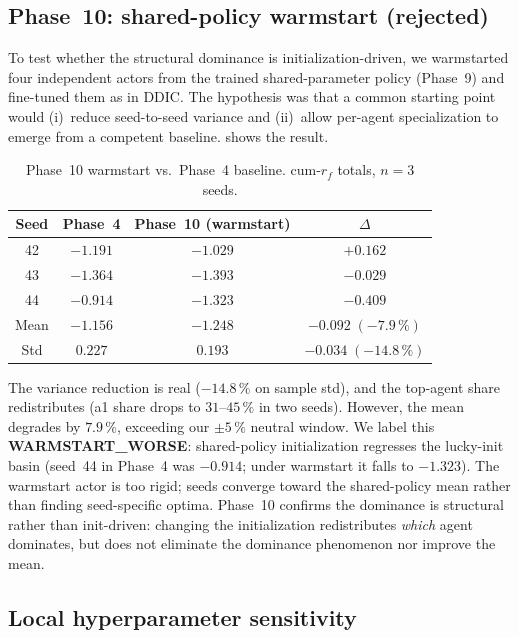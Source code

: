 \documentclass[journal,onecolumn,11pt]{IEEEtran}
\begin{document}
\subsection{Phase~10: shared-policy warmstart (rejected)}

To test whether the structural dominance is initialization-driven, we
warmstarted four independent actors from the trained shared-parameter
policy (Phase~9) and fine-tuned them as in DDIC. The hypothesis was
that a common starting point would (i)~reduce seed-to-seed variance
and (ii)~allow per-agent specialization to emerge from a competent
baseline.  shows the result.

\begin{table}[!t]
  \centering
  \caption{Phase~10 warmstart vs.\ Phase~4 baseline. cum-$r_f$ totals,
  $n = 3$ seeds.}
  \label{tab:phase10}
  \footnotesize
  \begin{tabular}{cccc}
    \toprule
    Seed & Phase~4 & Phase~10 (warmstart) & $\Delta$ \\
    \midrule
    42 & $-1.191$ & $-1.029$ & $+0.162$ \\
    43 & $-1.364$ & $-1.393$ & $-0.029$ \\
    44 & $-0.914$ & $-1.323$ & $-0.409$ \\
    \midrule
    Mean & $-1.156$ & $-1.248$ & $-0.092\;(-7.9\,\%)$ \\
    Std  & $0.227$  & $0.193$  & $-0.034\;(-14.8\,\%)$ \\
    \bottomrule
  \end{tabular}
\end{table}

The variance reduction is real ($-14.8\,\%$ on sample std), and the
top-agent share redistributes (a1 share drops to $31$--$45\,\%$ in two
seeds). However, the mean degrades by $7.9\,\%$, exceeding our $\pm
5\,\%$ neutral window. We label this \textbf{WARMSTART\_WORSE}:
shared-policy initialization regresses the lucky-init basin (seed~44
in Phase~4 was $-0.914$; under warmstart it falls to $-1.323$). The
warmstart actor is too rigid; seeds converge toward the shared-policy
mean rather than finding seed-specific optima. Phase~10 confirms
the dominance is structural rather than init-driven: changing
the initialization redistributes \emph{which} agent dominates, but does
not eliminate the dominance phenomenon nor improve the mean.

\subsection{Local hyperparameter sensitivity}\label{ssec:hparam-sensitivity}
\end{document}
